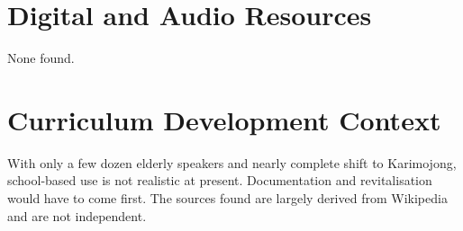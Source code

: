 \documentclass[12pt]{article}
\begin{document}
\section{Digital and Audio Resources}
None found.

\section{Curriculum Development Context}
With only a few dozen elderly speakers and nearly complete shift to Karimojong, school-based use is not realistic at present. Documentation and revitalisation would have to come first. The sources found are largely derived from Wikipedia and are not independent.
\end{document}
